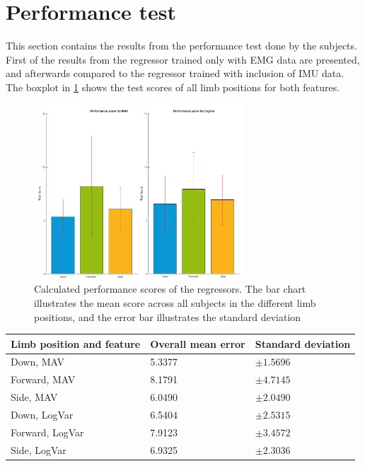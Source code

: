 \section{Performance test}
This section contains the results from the performance test done by the subjects. First of the results from the regressor trained only with EMG data are presented, and afterwards compared to the regressor trained with inclusion of IMU data. The boxplot in \ref{fig:GotItTime} shows the test scores of all limb positions for both features.

\begin{figure}[H]
	\includegraphics[width=0.7\textwidth]{figures/results/GotItTime}  %
	\caption{Calculated performance scores of the regressors. The bar chart illustrates the mean score across all subjects in the different limb positions, and the error bar illustrates the standard deviation}
	\label{fig:GotItTime}  %
\end{figure}

	\begin{center}
		\begin{tabular}{l l l}
			\toprule
			\textbf{Limb position and feature} & \textbf{Overall mean error} & \textbf{Standard deviation}\\
			\midrule
			Down, MAV & 5.3377 & $\pm 1.5696$ \\
			Forward, MAV & 8.1791 & $\pm 4.7145$ \\
			Side, MAV & 6.0490 & $\pm 2.0490$ \\
			Down, LogVar & 6.5404 & $\pm 2.5315$ \\
			Forward, LogVar & 7.9123 & $\pm 3.4572$ \\
			Side, LogVar & 6.9325 & $\pm 2.3036$ \\
			\bottomrule
		\end{tabular}
	\end{center}

